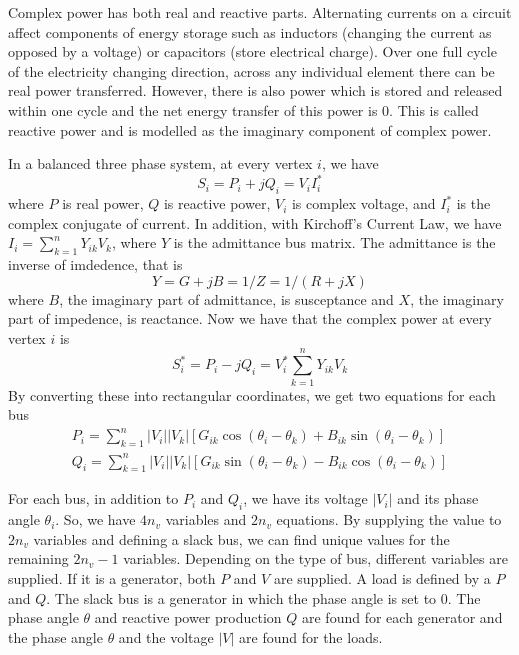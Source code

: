 Complex power has both real and reactive parts.  Alternating currents  on a circuit affect components of energy storage such as inductors (changing the current as opposed by a voltage)  or capacitors (store electrical charge).  Over one full cycle of the electricity changing direction, across any individual element there can be real power transferred.  However, there is also power which is stored and released within one cycle and the net energy transfer of this power is 0.  This is called reactive power and is modelled as the imaginary component of complex power.  




In a balanced three phase system, at every vertex $i$, we have
\begin{equation}
S_i = P_i + j Q_i = V_i I_i^*
\end{equation}
where $P$ is real power, $Q$ is reactive power, $V_i$ is complex voltage, and $I_i^*$ is the complex conjugate of current.  In addition, with Kirchoff's Current Law, we have $I_i = \sum_{k=1}^n Y_{ik} V_k$, where $Y$ is the admittance bus matrix.  The admittance is the inverse of imdedence, that is
\begin{equation}
Y = G + j B = 1/Z = 1/(R + jX) 
\end{equation}
where $B$, the imaginary part of admittance, is susceptance and $X$, the imaginary part of impedence, is reactance.  Now we have that the complex power at every vertex $i$ is
\begin{equation}
S_i^* = P_i - j Q_i = V_i^* \sum_{k=1}^n Y_{ik} V_k
\end{equation}
By converting these into rectangular coordinates, we get two equations for each bus
\begin{align}
P_i = \sum_{k=1}^n |V_i| |V_k| \left[ G_{ik} \cos (\theta_i - \theta_k) + B_{ik} \sin (\theta_i - \theta_k) \right]  \label{activepower}\\
Q_i = \sum_{k=1}^n |V_i| |V_k| \left[ G_{ik} \sin (\theta_i - \theta_k) - B_{ik} \cos (\theta_i - \theta_k) \right] 
\end{align}

For each bus, in addition to $P_i$ and $Q_i$,  we have its voltage $|V_i|$ and its phase angle $\theta_i$.  So, we have $4 n_v$ variables and $2 n_v$ equations.  By supplying the value to $2 n_v$ variables and defining a slack bus, we can find unique values for the remaining $2n_v - 1 $ variables.  Depending on the type of bus, different variables are supplied.  If it is a generator, both $P$  and $V$ are supplied.  A load is defined by a $P$ and $Q$.  The slack bus is a generator in which the phase angle is set to 0.  The phase angle $\theta$ and reactive power production $Q$ are found for each generator and the phase angle $\theta$ and the voltage $|V|$ are found for the loads.


